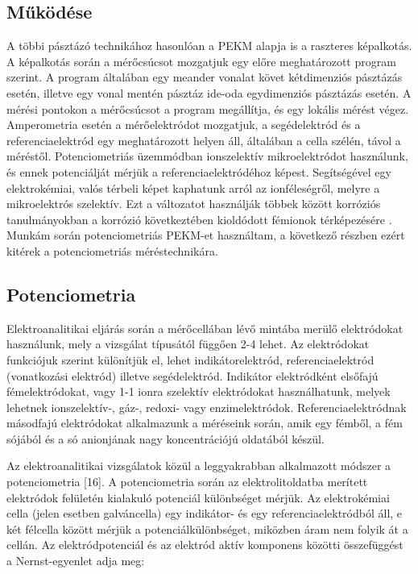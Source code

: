 \subsection{Működése}

A többi pásztázó technikához hasonlóan a PEKM alapja is a raszteres képalkotás. A képalkotás során a mérőcsúcsot mozgatjuk egy előre meghatározott program szerint. A program általában egy meander vonalat követ kétdimenziós pásztázás esetén, illetve egy vonal mentén pásztáz ide-oda egydimenziós pásztázás esetén. A mérési pontokon a mérőcsúcsot a program megállítja, és egy lokális mérést végez. Amperometria esetén a mérőelektródot mozgatjuk, a segédelektród és a referenciaelektród egy meghatározott helyen áll, általában a cella szélén, távol a méréstől. Potenciometriás üzemmódban ionszelektív mikroelektródot használunk, és ennek potenciálját mérjük a referenciaelektródéhoz képest. Segítségével egy elektrokémiai, valós térbeli képet kaphatunk arról az ionféleségről, melyre a mikroelektrós szelektív. Ezt a változatot használják többek között korróziós tanulmányokban a korrózió következtében kioldódott fémionok térképezésére \cite{bastos2010micropotentiometric, lamaka2008monitoring, karavai2010localized}. Munkám során potenciometriás PEKM-et használtam, a következő részben ezért kitérek a potenciometriás méréstechnikára.



\subsection{Potenciometria}

Elektroanalitikai eljárás során a mérőcellában lévő mintába merülő elektródokat használunk, mely a vizsgálat típusától függően 2-4 lehet. Az elektródokat funkciójuk szerint különítjük el, lehet indikátorelektród, referenciaelektród (vonatkozási elektród) illetve segédelektród. Indikátor elektródként elsőfajú fémelektródokat, vagy 1-1 ionra szelektív elektródokat használhatunk, melyek lehetnek ionszelektív-, gáz-, redoxi- vagy enzimelektródok. Referenciaelektródnak másodfajú elektródokat alkalmazunk a méréseink során, amik egy fémből, a fém sójából és a só anionjának nagy koncentrációjú oldatából készül.

Az elektroanalitikai vizsgálatok közül a leggyakrabban alkalmazott módszer a potenciometria [16]. A potenciometria során az elektrolitoldatba merített elektródok felületén kialakuló potenciál különbséget mérjük. Az elektrokémiai cella (jelen esetben galváncella) egy indikátor- és egy referenciaelektródból áll, e két félcella között mérjük a potenciálkülönbséget, miközben áram nem folyik át a cellán. Az elektródpotenciál és az elektród aktív komponens közötti összefüggést a Nernst-egyenlet adja meg:

